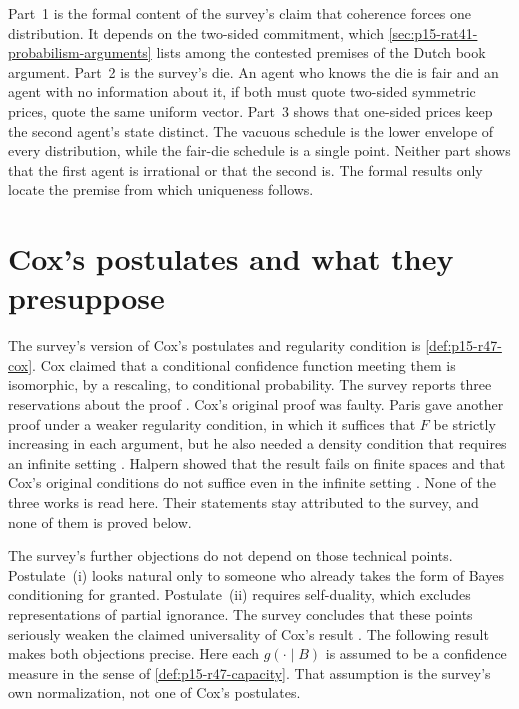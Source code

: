 Part~1 is the formal content of the survey's claim that coherence forces
one distribution. It depends on the two-sided commitment, which
\cref{sec:p15-rat41-probabilism-arguments} lists among the contested
premises of the Dutch book argument. Part~2 is the survey's die. An agent
who knows the die is fair and an agent with no information about it, if
both must quote two-sided symmetric prices, quote the same uniform vector.
Part~3 shows that one-sided prices keep the second agent's state distinct.
The vacuous schedule is the lower envelope of every distribution, while
the fair-die schedule is a single point. Neither part shows that the
first agent is irrational or that the second is. The formal results only
locate the premise from which uniqueness follows.

\section{Cox's postulates and what they presuppose}
\label{sec:p15-w02b-p15-032-cox}

The survey's version of Cox's postulates and regularity condition is
\cref{def:p15-r47-cox}. Cox claimed that a conditional confidence function
meeting them is isomorphic, by a rescaling, to conditional probability.
The survey reports three reservations about the proof
\cite[p.~310]{DuboisPrade2021RepresentingBelief}. Cox's original proof was
faulty. Paris gave another proof under a weaker regularity condition, in
which it suffices that \(F\) be strictly increasing in each argument, but he
also needed a density condition that requires an infinite setting
\cite{R47Paris1994}. Halpern showed that the result fails on finite
spaces and that Cox's original conditions do not suffice even in the
infinite setting \cite{R47Halpern1999a,R47Halpern1999b}. None of the three
works is read here. Their statements stay attributed to the survey, and
none of them is proved below.

The survey's further objections do not depend on those technical points.
Postulate~(i) looks natural only to someone who already takes the form of
Bayes conditioning for granted. Postulate~(ii) requires self-duality, which
excludes representations of partial ignorance. The survey concludes that
these points seriously weaken the claimed universality of Cox's result
\cite[p.~310]{DuboisPrade2021RepresentingBelief}. The following result
makes both objections precise. Here each \(g(\cdot\mid B)\) is assumed to
be a confidence measure in the sense of \cref{def:p15-r47-capacity}. That
assumption is the survey's own normalization, not one of Cox's postulates.


